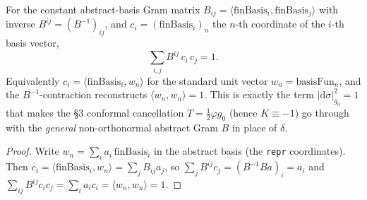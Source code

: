 \begin{lemma}[inverse-Gram/coordinate identity $\sum_{ij}B^{ij}c_ic_j=1$]
  \label{lem:dc-ch8-3-inverse-gram-coord}
  \leanok
  For the constant abstract-basis Gram matrix
  $B_{ij}=\langle\text{finBasis}_i,\text{finBasis}_j\rangle$ with inverse
  $B^{ij}=(B^{-1})_{ij}$, and $c_i=(\text{finBasis}_i)_n$ the $n$-th coordinate of
  the $i$-th basis vector,
  $$\sum_{i,j} B^{ij}\,c_i\,c_j = 1.$$
  Equivalently $c_i=\langle\text{finBasis}_i, w_n\rangle$ for the standard unit
  vector $w_n=\text{basisFun}_n$, and the $B^{-1}$-contraction reconstructs
  $\langle w_n, w_n\rangle=1$. This is exactly the term
  $|\mathrm d\sigma|^2_{g_0}=1$ that makes the §3 conformal cancellation
  $T=\tfrac12\varphi g_0$ (hence $K\equiv-1$) go through with the \emph{general}
  non-orthonormal abstract Gram $B$ in place of $\delta$.
\end{lemma}
\begin{proof}
  \leanok
  Write $w_n=\sum_i a_i\,\text{finBasis}_i$ in the abstract basis (the
  \texttt{repr} coordinates). Then $c_i=\langle\text{finBasis}_i,w_n\rangle=\sum_j
  B_{ij}a_j$, so $\sum_j B^{ij}c_j=(B^{-1}B a)_i=a_i$ and
  $\sum_{ij}B^{ij}c_ic_j=\sum_i a_i c_i=\langle w_n,w_n\rangle=1$.
\end{proof}

